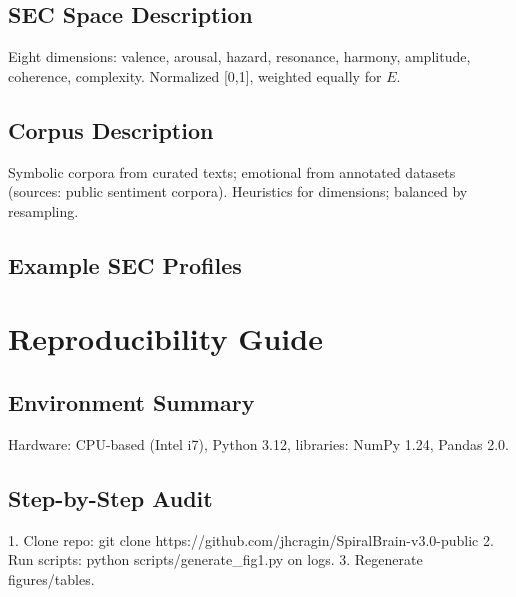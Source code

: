 \documentclass[11pt,a4paper]{article}
\begin{document}
\subsection{SEC Space Description}
Eight dimensions: valence, arousal, hazard, resonance, harmony, amplitude, coherence, complexity. Normalized [0,1], weighted equally for \(E\).

\subsection{Corpus Description}
Symbolic corpora from curated texts; emotional from annotated datasets (sources: public sentiment corpora). Heuristics for dimensions; balanced by resampling.

\subsection{Example SEC Profiles}

\begin{table}[H]
\centering
\caption{Example SEC Vectors}
\renewcommand{\arraystretch}{1.50}
\end{table}

\section{Reproducibility Guide}
\label{app:repro}

\subsection{Environment Summary}
Hardware: CPU-based (Intel i7), Python 3.12, libraries: NumPy 1.24, Pandas 2.0.

\subsection{Step-by-Step Audit}
1. Clone repo: git clone https://github.com/jhcragin/SpiralBrain-v3.0-public
2. Run scripts: python scripts/generate\_fig1.py on logs.
3. Regenerate figures/tables.
\end{document}
